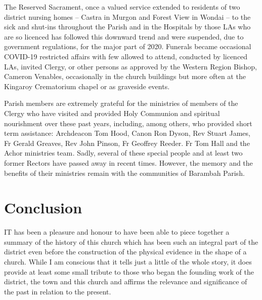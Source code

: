 The Reserved Sacrament, once a valued service extended to residents of two district nursing homes -- Castra in Murgon and Forest View in Wondai -- to the sick and shut-ins throughout the Parish and in the Hospitals by those LAs who are so licenced has followed this downward trend and were suspended, due to government regulations, for the major part of 2020. Funerals became occasional COVID-19 restricted affairs with few allowed to attend, conducted by licenced LAs, invited Clergy, or other persons as approved by the Western Region Bishop, Cameron Venables, occasionally in the church buildings but more often at the Kingaroy Crematorium chapel or as graveside events.



Parish members are extremely grateful for the ministries of members of the Clergy who have visited and provided Holy Communion and spiritual nourishment over these past years, including, among others, who provided short term assistance: Archdeacon Tom Hood, Canon Ron Dyson, Rev Stuart James, Fr Gerald Greaves, Rev John Pinson, Fr Geoffrey Reeder. Fr Tom Hall and the Achor ministries team\emph{.} Sadly, several of these special people and at least two former Rectors have passed away in recent times. However, the memory and the benefits of their ministries remain with the communities of Barambah Parish.



\balance


\printendnotes[custom]
\setcounter{endnote}{0}
\chapter{Conclusion}
\nobalance


\lettrine[lines=3]{I}{T}
 has been a pleasure and honour to have been able to piece together a summary of the history of this church which has been such an integral part of the district even before the construction of the physical evidence in the shape of a church. While I am conscious that it tells just a little of the whole story, it does provide at least some small tribute to those who began the founding work of the district, the town and this church and affirms the relevance and significance of the past in relation to the present.

